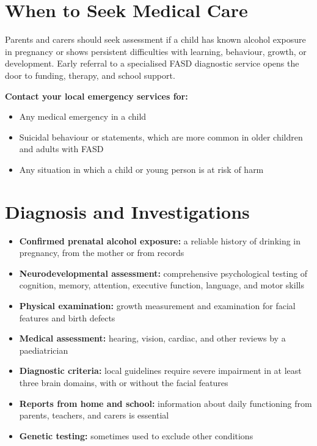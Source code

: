 \section*{When to Seek Medical Care}
Parents and carers should seek assessment if a child has known alcohol exposure in pregnancy or shows persistent difficulties with learning, behaviour, growth, or development. Early referral to a specialised FASD diagnostic service opens the door to funding, therapy, and school support.

\textbf{Contact your local emergency services for:}
\begin{itemize}
    \item Any medical emergency in a child
    \item Suicidal behaviour or statements, which are more common in older children and adults with FASD
    \item Any situation in which a child or young person is at risk of harm
\end{itemize}

\section*{Diagnosis and Investigations}
\begin{itemize}
    \item \textbf{Confirmed prenatal alcohol exposure:} a reliable history of drinking in pregnancy, from the mother or from records
    \item \textbf{Neurodevelopmental assessment:} comprehensive psychological testing of cognition, memory, attention, executive function, language, and motor skills
    \item \textbf{Physical examination:} growth measurement and examination for facial features and birth defects
    \item \textbf{Medical assessment:} hearing, vision, cardiac, and other reviews by a paediatrician
    \item \textbf{Diagnostic criteria:} local guidelines require severe impairment in at least three brain domains, with or without the facial features
    \item \textbf{Reports from home and school:} information about daily functioning from parents, teachers, and carers is essential
    \item \textbf{Genetic testing:} sometimes used to exclude other conditions
\end{itemize}

